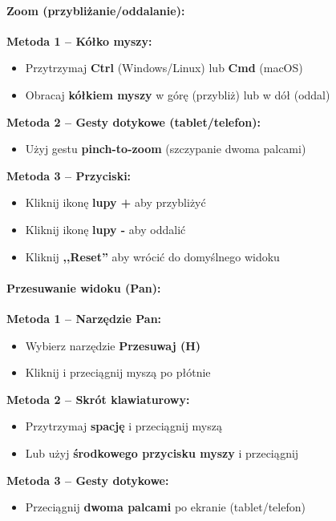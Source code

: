 \documentclass[12pt,a4paper]{article}
\begin{document}
\paragraph{Zoom (przybliżanie/oddalanie):}

\textbf{Metoda 1 -- Kółko myszy:}
\begin{itemize}
    \item Przytrzymaj \textbf{Ctrl} (Windows/Linux) lub \textbf{Cmd} (macOS)
    \item Obracaj \textbf{kółkiem myszy} w górę (przybliż) lub w dół (oddal)
\end{itemize}

\textbf{Metoda 2 -- Gesty dotykowe (tablet/telefon):}
\begin{itemize}
    \item Użyj gestu \textbf{pinch-to-zoom} (szczypanie dwoma palcami)
\end{itemize}

\textbf{Metoda 3 -- Przyciski:}
\begin{itemize}
    \item Kliknij ikonę \textbf{lupy +} aby przybliżyć
    \item Kliknij ikonę \textbf{lupy -} aby oddalić
    \item Kliknij \textbf{,,Reset''} aby wrócić do domyślnego widoku
\end{itemize}

\paragraph{Przesuwanie widoku (Pan):}

\textbf{Metoda 1 -- Narzędzie Pan:}
\begin{itemize}
    \item Wybierz narzędzie \textbf{Przesuwaj (H)}
    \item Kliknij i przeciągnij myszą po płótnie
\end{itemize}

\textbf{Metoda 2 -- Skrót klawiaturowy:}
\begin{itemize}
    \item Przytrzymaj \textbf{spację} i przeciągnij myszą
    \item Lub użyj \textbf{środkowego przycisku myszy} i przeciągnij
\end{itemize}

\textbf{Metoda 3 -- Gesty dotykowe:}
\begin{itemize}
    \item Przeciągnij \textbf{dwoma palcami} po ekranie (tablet/telefon)
\end{itemize}
\end{document}
